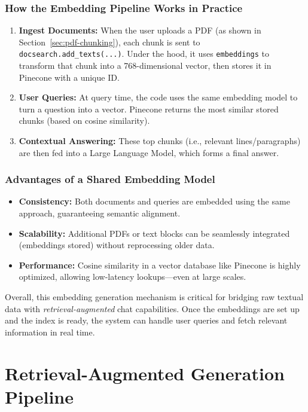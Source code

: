 \subsubsection*{How the Embedding Pipeline Works in Practice}
\begin{enumerate}
    \item \textbf{Ingest Documents:} 
    When the user uploads a PDF (as shown in Section~\ref{sec:pdf-chunking}), each chunk is sent to \texttt{docsearch.add\_texts(...)}. Under the hood, it uses \texttt{embeddings} to transform that chunk into a 768-dimensional vector, then stores it in Pinecone with a unique ID.
    \item \textbf{User Queries:} 
    At query time, the code uses the same embedding model to turn a question into a vector. Pinecone returns the most similar stored chunks (based on cosine similarity).
    \item \textbf{Contextual Answering:} 
    These top chunks (i.e., relevant lines/paragraphs) are then fed into a Large Language Model, which forms a final answer. 
\end{enumerate}

\subsubsection*{Advantages of a Shared Embedding Model}
\begin{itemize}
    \item \textbf{Consistency:} Both documents and queries are embedded using the same approach, guaranteeing semantic alignment.
    \item \textbf{Scalability:} Additional PDFs or text blocks can be seamlessly integrated (embeddings stored) without reprocessing older data.
    \item \textbf{Performance:} Cosine similarity in a vector database like Pinecone is highly optimized, allowing low-latency lookups—even at large scales.
\end{itemize}

\noindent Overall, this embedding generation mechanism is critical for bridging raw textual data with \emph{retrieval-augmented} chat capabilities. Once the embeddings are set up and the index is ready, the system can handle user queries and fetch relevant information in real time.

\section{Retrieval-Augmented Generation Pipeline}
\label{sec:rag-pipeline}

